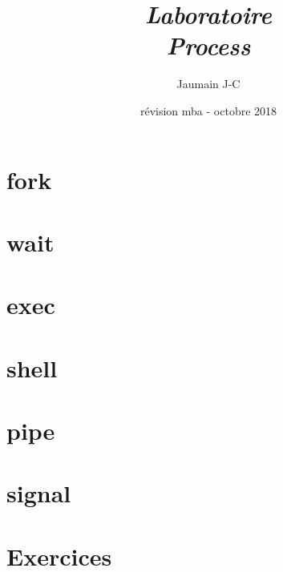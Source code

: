 \documentclass[french,10pt,A4]{report}
\begin{document}
\rfoot{\today}
\cfoot{ }
\renewcommand{\footrulewidth}{0.4pt}

\setlength{\parindent}{0pt} %

\lstset{frame=trBL}

\setcounter{tocdepth}{1}	%
\setcounter{secnumdepth}{5}	%

\newcommand{\titre}{Titre du sujet}	%

\thispagestyle{empty}

\title{\emph{Laboratoire\\\textbf{Process}}}
\author{Jaumain J-C}
\date{révision mba - octobre 2018}
\maketitle
\tableofcontents


\newpage
%
\chapter{fork}
\chapter{wait}
\chapter{exec}
\chapter{shell}
\chapter{pipe}
\chapter{signal}

\chapter{Exercices}
	
\end{document}
